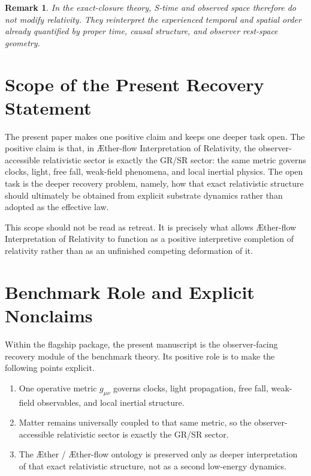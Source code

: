 \documentclass[11pt]{article}
\newcommand{\Aether}{\AE{}ther}
\newcommand{\Aflow}{\AE{}ther-flow}
\newcommand{\TheoryName}{\Aflow{} Interpretation of Relativity}
\newtheorem{remark}{Remark}
\begin{document}
\begin{remark}
In the exact-closure theory, S-time and observed space therefore do not modify relativity. They reinterpret the experienced temporal and spatial order already quantified by proper time, causal structure, and observer rest-space geometry.
\end{remark}

\section{Scope of the Present Recovery Statement}

The present paper makes one positive claim and keeps one deeper task open. The positive claim is that, in \TheoryName{}, the observer-accessible relativistic sector is exactly the GR/SR sector: the same metric governs clocks, light, free fall, weak-field phenomena, and local inertial physics. The open task is the deeper recovery problem, namely, how that exact relativistic structure should ultimately be obtained from explicit substrate dynamics rather than adopted as the effective law.

This scope should not be read as retreat. It is precisely what allows \TheoryName{} to function as a positive interpretive completion of relativity rather than as an unfinished competing deformation of it.

\section{Benchmark Role and Explicit Nonclaims}

Within the flagship package, the present manuscript is the observer-facing recovery module of the benchmark theory. Its positive role is to make the following points explicit.
\begin{enumerate}
    \item One operative metric \(g_{\mu\nu}\) governs clocks, light propagation, free fall, weak-field observables, and local inertial structure.
    \item Matter remains universally coupled to that same metric, so the observer-accessible relativistic sector is exactly the GR/SR sector.
    \item The \Aether{} / \Aflow{} ontology is preserved only as deeper interpretation of that exact relativistic structure, not as a second low-energy dynamics.
\end{enumerate}
\end{document}
